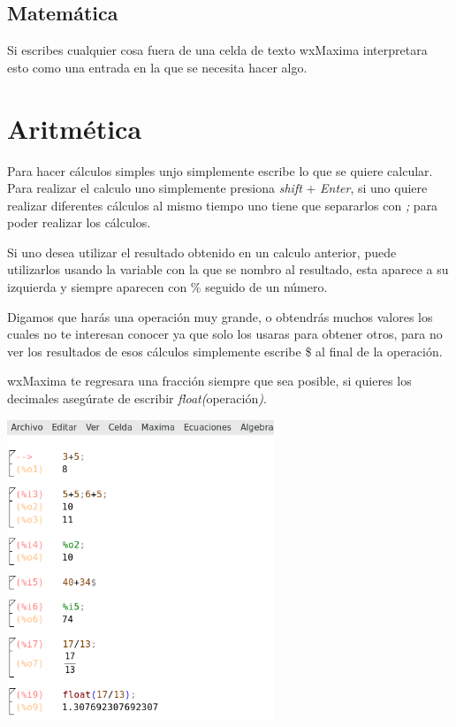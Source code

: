 \documentclass{article}
\begin{document}
\subsection{Matemática}

Si escribes cualquier cosa fuera de una celda de texto wxMaxima interpretara esto como una entrada en la que se necesita hacer algo.



\section{Aritmética}

Para hacer cálculos simples unjo simplemente escribe lo que se quiere calcular. Para realizar el calculo uno simplemente presiona \textit{shift} + \textit{Enter}, si uno quiere realizar diferentes cálculos al mismo tiempo uno tiene que separarlos con \textit{;} para poder realizar los cálculos.

\vspace{0.3cm}

Si uno desea utilizar el resultado obtenido en un calculo anterior, puede utilizarlos usando la variable con la que se nombro al resultado, esta aparece a su izquierda  y siempre aparecen con \% seguido de un número. 

\vspace{0.3cm}

Digamos que harás una operación muy grande, o obtendrás muchos valores los cuales no te interesan conocer ya que solo los usaras para obtener otros, para no ver los resultados de esos cálculos simplemente escribe \$ al final de la operación.

\vspace{0.3cm}

wxMaxima te regresara una fracción siempre que sea posible, si quieres los decimales asegúrate de escribir \textit{float(}operación\textit{)}.

\begin{center}
	\includegraphics[width=8cm]{Aritmetica.png}
    
\end{center}
\vspace{0.3cm}
\end{document}
